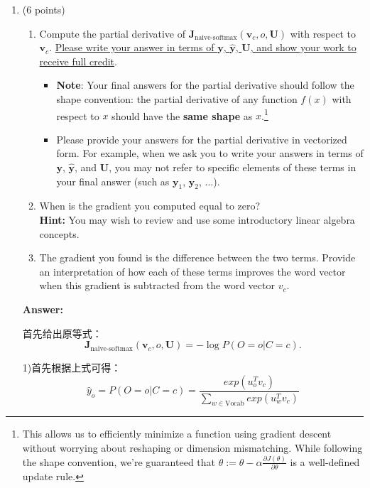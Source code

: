 \documentclass{article}
\newenvironment{answer}{
    {\bf Answer:} \sf \begingroup\color{red}
}{\endgroup}%
\begin{document}
\begin{enumerate}[label=(\alph*)]
\item (6 points)
\begin{enumerate}[label=(\roman*)]
    \item 
    Compute the partial derivative of $\bm J_{\text{naive-softmax}}(\bm v_c, o, \bm U)$ with respect to $\bm v_c$. \ul{Please write your answer in terms of $\bm y$, $\hat{\bm y}$, $\bm U$, and show your work to receive full credit}.
    \begin{itemize} 
        \item \textbf{Note}: Your final answers for the partial derivative should follow the shape convention: the partial derivative of any function $f(x)$ with respect to $x$ should have the \textbf{same shape} as $x$.\footnote{This allows us to efficiently minimize a function using gradient descent without worrying about reshaping or dimension mismatching. While following the shape convention, we're guaranteed that $\theta:= \theta - \alpha\frac{\partial J(\theta)}{\partial \theta}$ is a well-defined update rule.}
        \item Please provide your answers for the partial derivative in vectorized form. For example, when we ask you to write your answers in terms of $\bm y$, $\hat{\bm y}$, and $\bm U$, you may not refer to specific elements of these terms in your final answer (such as $\bm y_1$, $\bm y_2$, $\dots$). 
    \end{itemize}
    \item
    When is the gradient you computed equal to zero? \\
    \textbf{Hint:} You may wish to review and use some introductory linear algebra concepts.
    \item
    The gradient you found is the difference between the two terms. Provide an interpretation of how each of these terms improves the word vector when this gradient is subtracted from the word vector $v_c$.

\end{enumerate}

\begin{shaded}
\begin{answer}
首先给出原等式：
\begin{equation}
	\bm J_{\text{naive-softmax}}(\bm v_c, o, \bm U) = -\log P(O=o| C=c).
\label{naive-softmax}
\end{equation}

1)首先根据上式可得：
\begin{equation}
	 \hat{y}_o = P(O=o|C=c)=\frac{exp(u_o^T v_c)}{\sum_{w\in \text{Vocab}} exp(u_w^T v_c)}
\end{equation}


\end{answer}
\end{shaded}
\end{enumerate}
\end{document}
